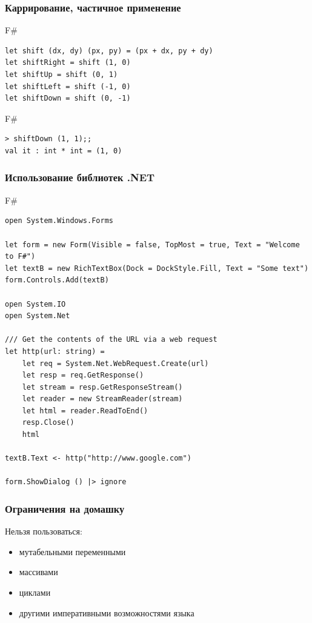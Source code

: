 \documentclass[xetex,mathserif,serif]{beamer}
\begin{document}
	\begin{frame}[fragile]
		\frametitle{Каррирование, частичное применение}
		\begin{exampleblock}{F\#}
			\begin{lstlisting}
let shift (dx, dy) (px, py) = (px + dx, py + dy)
let shiftRight = shift (1, 0)
let shiftUp = shift (0, 1)
let shiftLeft = shift (-1, 0)
let shiftDown = shift (0, -1)
            \end{lstlisting}
		\end{exampleblock}
		\begin{alertblock}{F\#}
			\begin{lstlisting}
> shiftDown (1, 1);;
val it : int * int = (1, 0)
            \end{lstlisting}
		\end{alertblock}
\end{frame}

	\begin{frame}[fragile]
		\frametitle{Использование библиотек .NET}
		\begin{exampleblock}{F\#}
			\begin{lstlisting}[basicstyle=\ttfamily\tiny]
open System.Windows.Forms

let form = new Form(Visible = false, TopMost = true, Text = "Welcome to F#")
let textB = new RichTextBox(Dock = DockStyle.Fill, Text = "Some text")
form.Controls.Add(textB)

open System.IO
open System.Net

/// Get the contents of the URL via a web request
let http(url: string) =
    let req = System.Net.WebRequest.Create(url)
    let resp = req.GetResponse()
    let stream = resp.GetResponseStream()
    let reader = new StreamReader(stream)
    let html = reader.ReadToEnd()
    resp.Close()
    html

textB.Text <- http("http://www.google.com")

form.ShowDialog () |> ignore
           \end{lstlisting}
       \end{exampleblock}
\end{frame}

	\begin{frame}
		\frametitle{Ограничения на домашку}
		Нельзя пользоваться:
		\begin{itemize}
			\item мутабельными переменными
			\item массивами
			\item циклами
			\item другими императивными возможностями языка
		\end{itemize}
	\end{frame}
\end{document}

